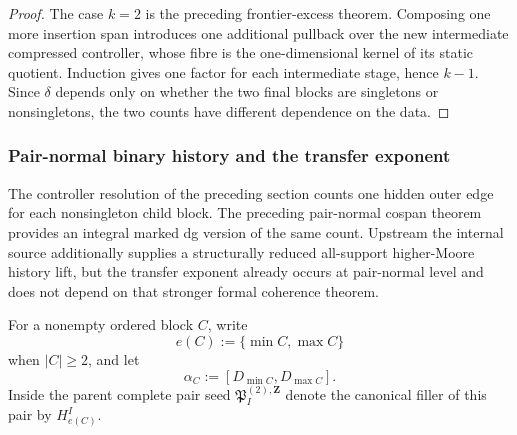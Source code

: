 \documentclass[11pt]{article}
\theoremstyle{remark}
\newcommand{\Z}{\mathbf Z}
\begin{document}
\begin{proof}
The case $k=2$ is the preceding frontier-excess theorem.  Composing one more
insertion span introduces one additional pullback over the new intermediate
compressed controller, whose fibre is the one-dimensional kernel of its
static quotient.  Induction gives one factor for each intermediate stage,
hence $k-1$.  Since $\delta$ depends only on whether the two final blocks are
singletons or nonsingletons, the two counts have different dependence on the
data.
\end{proof}

\subsubsection{Pair-normal binary history and the transfer exponent}


The controller resolution of the preceding section counts one hidden outer
edge for each nonsingleton child block.  The preceding pair-normal cospan
theorem provides an integral marked dg version of the same count.  Upstream
the internal source additionally supplies a structurally reduced all-support higher-Moore
history lift, but the transfer exponent already occurs at pair-normal level
and does not depend on that stronger formal coherence theorem.

For a nonempty ordered block $C$, write
\[
 e(C):=\{\min C,\max C\}
\]
when $|C|\ge2$, and let
\[
 \alpha_C:=[D_{\min C},D_{\max C}].
\]
Inside the parent complete pair seed $\mathfrak P_I^{(2),\Z}$ denote the
canonical filler of this pair by $H_{e(C)}^I$.
\end{document}

